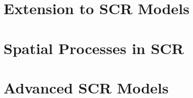 \documentclass{book}
\begin{document}






\part{Extension to SCR Models}















\part{Spatial Processes in SCR}











\part{Advanced SCR Models}
\end{document}
